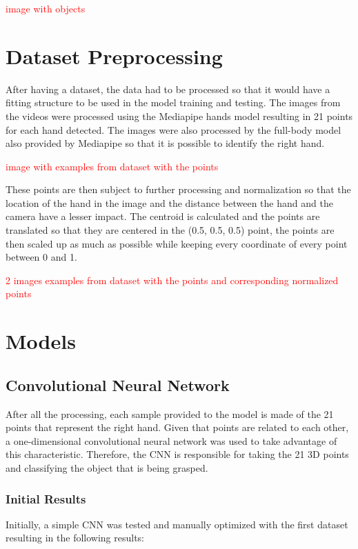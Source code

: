 \textcolor{red}{image with objects}

\section{Dataset Preprocessing}

After having a dataset, the data had to be processed so that it would have a fitting structure to be used in the model training and testing. The images from the videos were processed using the Mediapipe hands model resulting in 21 points for each hand detected. The images were also processed by the full-body model also provided by Mediapipe so that it is possible to identify the right hand.

\textcolor{red}{image with examples from dataset with the points}

These points are then subject to further processing and normalization so that the location of the hand in the image and the distance between the hand and the camera have a lesser impact. The centroid is calculated and the points are translated so that they are centered in the (0.5, 0.5, 0.5) point, the points are then scaled up as much as possible while keeping every coordinate of every point between 0 and 1.

\textcolor{red}{2 images examples from dataset with the points and corresponding normalized points}

\section{Models}

\subsection{Convolutional Neural Network}

After all the processing, each sample provided to the model is made of the 21 points that represent the right hand. Given that points are related to each other, a one-dimensional convolutional neural network was used to take advantage of this characteristic. Therefore, the CNN is responsible for taking the 21 3D points and classifying the object that is being grasped.

\subsubsection{Initial Results}

Initially, a simple CNN was tested and manually optimized with the first dataset resulting in the following results:

